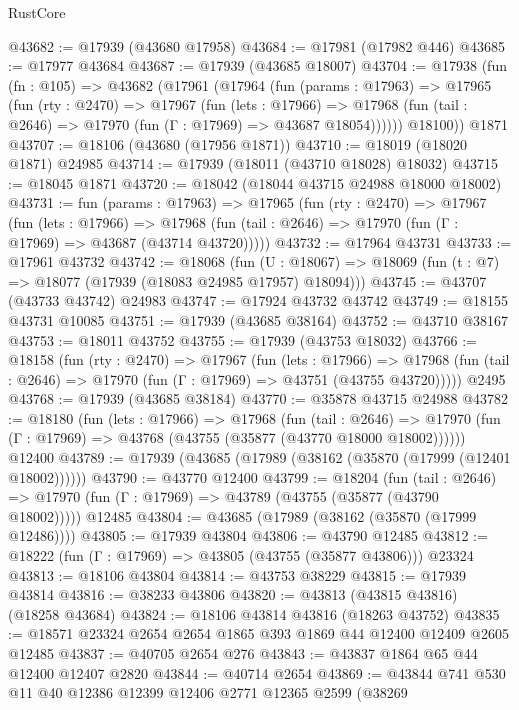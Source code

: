 \begin{lexlean}{RustCore}
\begin{coremodule}
@43682 := @17939 (@43680 @17958)
@43684 := @17981 (@17982 @446)
@43685 := @17977 @43684
@43687 := @17939 (@43685 @18007)
@43704 := @17938
    (fun (fn : @105) =>
    @43682
      (@17961
        (@17964
          (fun (params : @17963) =>
          @17965
            (fun (rty : @2470) =>
            @17967
              (fun (lets : @17966) =>
              @17968 (fun (tail : @2646) => @17970 (fun (Γ : @17969) => @43687 @18054))))))
        @18100))
    @1871
@43707 := @18106 (@43680 (@17956 @1871))
@43710 := @18019 (@18020 @1871) @24985
@43714 := @17939 (@18011 (@43710 @18028) @18032)
@43715 := @18045 @1871
@43720 := @18042 (@18044 @43715 @24988 @18000 @18002)
@43731 := fun (params : @17963) =>
  @17965
    (fun (rty : @2470) =>
    @17967
      (fun (lets : @17966) =>
      @17968 (fun (tail : @2646) => @17970 (fun (Γ : @17969) => @43687 (@43714 @43720)))))
@43732 := @17964 @43731
@43733 := @17961 @43732
@43742 := @18068
    (fun (U : @18067) => @18069 (fun (t : @7) => @18077 (@17939 (@18083 @24985 @17957) @18094)))
@43745 := @43707 (@43733 @43742) @24983
@43747 := @17924 @43732 @43742
@43749 := @18155 @43731 @10085
@43751 := @17939 (@43685 @38164)
@43752 := @43710 @38167
@43753 := @18011 @43752
@43755 := @17939 (@43753 @18032)
@43766 := @18158
    (fun (rty : @2470) =>
    @17967
      (fun (lets : @17966) =>
      @17968 (fun (tail : @2646) => @17970 (fun (Γ : @17969) => @43751 (@43755 @43720)))))
    @2495
@43768 := @17939 (@43685 @38184)
@43770 := @35878 @43715 @24988
@43782 := @18180
    (fun (lets : @17966) =>
    @17968
      (fun (tail : @2646) =>
      @17970 (fun (Γ : @17969) => @43768 (@43755 (@35877 (@43770 @18000 @18002))))))
    @12400
@43789 := @17939 (@43685 (@17989 (@38162 (@35870 (@17999 (@12401 @18002))))))
@43790 := @43770 @12400
@43799 := @18204
    (fun (tail : @2646) => @17970 (fun (Γ : @17969) => @43789 (@43755 (@35877 (@43790 @18002)))))
    @12485
@43804 := @43685 (@17989 (@38162 (@35870 (@17999 @12486))))
@43805 := @17939 @43804
@43806 := @43790 @12485
@43812 := @18222 (fun (Γ : @17969) => @43805 (@43755 (@35877 @43806))) @23324
@43813 := @18106 @43804
@43814 := @43753 @38229
@43815 := @17939 @43814
@43816 := @38233 @43806
@43820 := @43813 (@43815 @43816) (@18258 @43684)
@43824 := @18106 @43814 @43816 (@18263 @43752)
@43835 := @18571 @23324 @2654 @2654 @1865 @393 @1869 @44 @12400 @12409 @2605 @12485
@43837 := @40705 @2654 @276
@43843 := @43837 @1864 @65 @44 @12400 @12407 @2820
@43844 := @40714 @2654
@43869 := @43844
    @741
    @530
    @11
    @40
    @12386
    @12399
    @12406
    @2771
    @12365
    @2599
    (@38269

\end{coremodule}
\end{lexlean}
